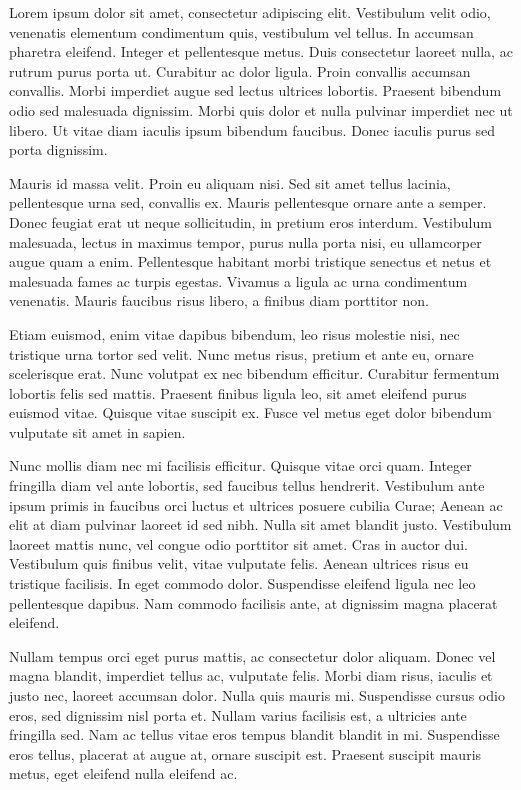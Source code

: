 \documentclass{article}
\begin{document}
\Large{Lorem ipsum dolor sit amet, consectetur adipiscing elit. Vestibulum velit odio, venenatis elementum condimentum quis, vestibulum vel tellus. In accumsan pharetra eleifend. Integer et pellentesque metus. Duis consectetur laoreet nulla, ac rutrum purus porta ut. Curabitur ac dolor ligula. Proin convallis accumsan convallis. Morbi imperdiet augue sed lectus ultrices lobortis. Praesent bibendum odio sed malesuada dignissim. Morbi quis dolor et nulla pulvinar imperdiet nec ut libero. Ut vitae diam iaculis ipsum bibendum faucibus. Donec iaculis purus sed porta dignissim.}

\Huge{Mauris id massa velit. Proin eu aliquam nisi. Sed sit amet tellus lacinia, pellentesque urna sed, convallis ex. Mauris pellentesque ornare ante a semper. Donec feugiat erat ut neque sollicitudin, in pretium eros interdum. Vestibulum malesuada, lectus in maximus tempor, purus nulla porta nisi, eu ullamcorper augue quam a enim. Pellentesque habitant morbi tristique senectus et netus et malesuada fames ac turpis egestas. Vivamus a ligula ac urna condimentum venenatis. Mauris faucibus risus libero, a finibus diam porttitor non.

\tiny{Etiam euismod, enim vitae dapibus bibendum, leo risus molestie nisi, nec tristique urna tortor sed velit. Nunc metus risus, pretium et ante eu, ornare scelerisque erat. Nunc volutpat ex nec bibendum efficitur. Curabitur fermentum lobortis felis sed mattis. Praesent finibus ligula leo, sit amet eleifend purus euismod vitae. Quisque vitae suscipit ex. Fusce vel metus eget dolor bibendum vulputate sit amet in sapien.}

\begin{center}
Nunc mollis diam nec mi facilisis efficitur. Quisque vitae orci quam. Integer fringilla diam vel ante lobortis, sed faucibus tellus hendrerit. Vestibulum ante ipsum primis in faucibus orci luctus et ultrices posuere cubilia Curae; Aenean ac elit at diam pulvinar laoreet id sed nibh. Nulla sit amet blandit justo. Vestibulum laoreet mattis nunc, vel congue odio porttitor sit amet. Cras in auctor dui. Vestibulum quis finibus velit, vitae vulputate felis. Aenean ultrices risus eu tristique facilisis. In eget commodo dolor. Suspendisse eleifend ligula nec leo pellentesque dapibus. Nam commodo facilisis ante, at dignissim magna placerat eleifend.
\end{center}

\Huge{Nullam tempus orci eget purus mattis, ac consectetur dolor aliquam. Donec vel magna blandit, imperdiet tellus ac, vulputate felis. Morbi diam risus, iaculis et justo nec, laoreet accumsan dolor. Nulla quis mauris mi. Suspendisse cursus odio eros, sed dignissim nisl porta et. Nullam varius facilisis est, a ultricies ante fringilla sed. Nam ac tellus vitae eros tempus blandit blandit in mi. Suspendisse eros tellus, placerat at augue at, ornare suscipit est. Praesent suscipit mauris metus, eget eleifend nulla eleifend ac.}

}
\end{document}
